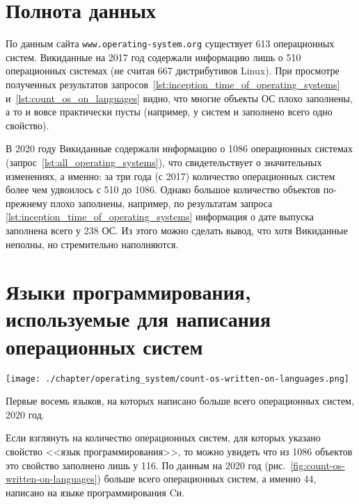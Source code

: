 \newpage
\section{Полнота данных}
По данным сайта \verb|www.operating-system.org| существует 613 операционных систем\autocite{list_operating_systems}. 
Викиданные на 2017 год содержали информацию лишь о 510 операционных системах 
(не считая \num{667} дистрибутивов Linux\autocite{list_operating_systems}). 
При просмотре полученных результатов 
запросов~\ref{lst:inception_time_of_operating_systems} и~\ref{lst:count_os_on_languages} видно, 
что многие объекты ОС плохо заполнены, а то и вовсе практически пусты 
(например, у систем  и  заполнено всего одно свойство\autocite{prowd_os_link}).

В 2020 году Викиданные содержали информацию о 1086 операционных системах 
(запрос~\ref{lst:all_operating_systems}), что свидетельствует о значительных изменениях, 
а именно: за три года (с 2017) количество операционных систем более чем удвоилось с 510 до 1086. 
Однако большое количество объектов по-прежнему плохо заполнены, 
например, по результатам запроса \ref{lst:inception_time_of_operating_systems} 
информация о дате выпуска заполнена всего у \num{238} ОС. 
Из этого можно сделать вывод, что хотя Викиданные неполны, но стремительно наполняются.




\section{Языки программирования, используемые для написания операционных систем}
%
\begin{marginfigure}[0\baselineskip]
	\texttt{[image: ./chapter/operating\_system/count-os-written-on-languages.png]}
    \caption[Первые языки, на которых написано больше всего ОС, 2020 год.]{Первые восемь языков, на которых написано больше всего операционных систем, 2020 год.}
	\label{fig:count-os-written-on-languages}
\end{marginfigure}

Если взглянуть на количество операционных систем, для которых указано свойство <<язык программирования>>, то можно увидеть что из \num{1086} объектов это свойство заполнено лишь у \num{116}. По данным на 2020 год (рис.~\ref{fig:count-os-written-on-languages}) больше всего операционных систем, а именно 44, написано на языке программирования Cи.




